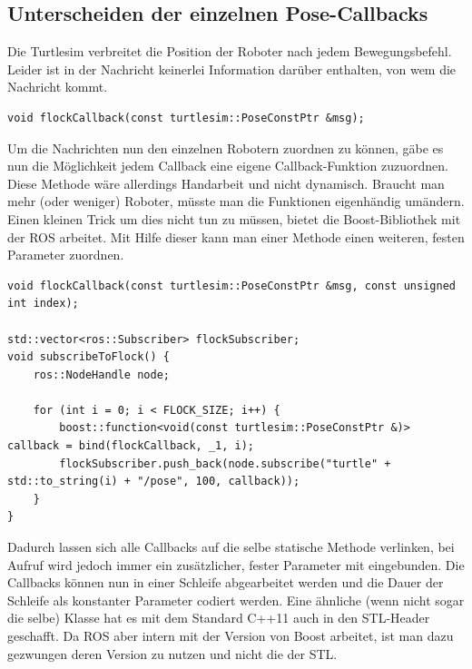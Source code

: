 \subsection*{Unterscheiden der einzelnen Pose-Callbacks}

Die Turtlesim verbreitet die Position der Roboter nach jedem Bewegungsbefehl. Leider ist in der Nachricht  keinerlei Information darüber enthalten, von wem die Nachricht kommt.

\begin{lstlisting}[style=cpp, title=Callback-Funktion für Pose.msg]
void flockCallback(const turtlesim::PoseConstPtr &msg);
\end{lstlisting}

Um die Nachrichten nun den einzelnen Robotern zuordnen zu können, gäbe es nun die Möglichkeit jedem Callback eine eigene Callback-Funktion zuzuordnen. Diese Methode wäre allerdings Handarbeit und nicht dynamisch. Braucht man mehr (oder weniger) Roboter, müsste man die Funktionen eigenhändig umändern.
Einen kleinen Trick um dies nicht tun zu müssen, bietet die Boost-Bibliothek mit der \ac{ROS} arbeitet. Mit Hilfe dieser kann man einer Methode einen weiteren, festen Parameter zuordnen.

\begin{lstlisting}[style=cpp, title=Callback-Funktion für Pose.msg mit Boost]
void flockCallback(const turtlesim::PoseConstPtr &msg, const unsigned int index);

std::vector<ros::Subscriber> flockSubscriber;
void subscribeToFlock() {
    ros::NodeHandle node;

    for (int i = 0; i < FLOCK_SIZE; i++) {
        boost::function<void(const turtlesim::PoseConstPtr &)> callback = bind(flockCallback, _1, i);
        flockSubscriber.push_back(node.subscribe("turtle" + std::to_string(i) + "/pose", 100, callback));
    }
}
\end{lstlisting}

Dadurch lassen sich alle Callbacks auf die selbe statische Methode verlinken, bei Aufruf wird jedoch immer ein zusätzlicher, fester Parameter mit eingebunden. Die Callbacks können nun in einer Schleife abgearbeitet werden und die Dauer der Schleife als konstanter Parameter codiert werden.
Eine ähnliche (wenn nicht sogar die selbe) Klasse hat es mit dem Standard C++11 auch in den STL-Header  geschafft\cite{CPP_REFERENCE_FUNCTION}. Da \ac{ROS} aber intern mit der Version von Boost arbeitet\cite{BOOST_REFERENCE_FUNCTION}\cite{ROS_SOURCE_NodeHandle}, ist man dazu gezwungen deren Version zu nutzen und nicht die der STL.


